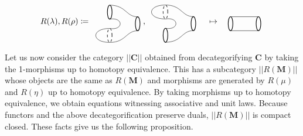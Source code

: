 \documentclass[11pt]{amsart}
\newcommand{\cat}[1]{\mathbf{#1}}
\theoremstyle{remark}
\theoremstyle{definition}
\begin{document}
%
%
%
\[
%
%
R(\lambda) , R(\rho) \coloneqq
\raisebox{-0.5\height}{%
\begin{tikzpicture}
\begin{scope}[shift={(1.2,-0.5)}]
\draw [thick]  (1.6,-0.2) ellipse (0.1 and 0.3);
\draw [thick]  (0.4,0.3) ellipse (0.1 and 0.3);
\draw [dashed] (0.4,-0.7) ellipse (0.1 and 0.3);
\draw (0.4,0) .. controls (1,0.1) and (1,-0.5) .. (0.4,-0.4);
\draw (0.4,0.6) .. controls (1.1,0.6) and (1.1,0.1) .. (1.6,0.1);
\draw (0.4,-1) .. controls (1.1,-1) and (1.1,-0.5) .. (1.6,-0.5);
\end{scope}
\begin{scope}[shift={(1.6,-1.2)}]
\draw [dashed]  (0,0) ellipse (0.1 and 0.3);
\draw (0,0.3) .. controls (-0.8,0.3) and (-0.8,-0.3) .. (0,-0.3);
\end{scope}
\end{tikzpicture}
}
%
%
%
,
%
%
\raisebox{-0.5\height}{%
\begin{tikzpicture}
\begin{scope}[shift={(1.2,-0.5)}]
\draw [thick]  (1.6,-0.2) ellipse (0.1 and 0.3);
\draw [dashed]  (0.4,0.3) ellipse (0.1 and 0.3);
\draw [thick] (0.4,-0.7) ellipse (0.1 and 0.3);
\draw (0.4,0) .. controls (1,0.1) and (1,-0.5) .. (0.4,-0.4);
\draw (0.4,0.6) .. controls (1.1,0.6) and (1.1,0.1) .. (1.6,0.1);
\draw (0.4,-1) .. controls (1.1,-1) and (1.1,-0.5) .. (1.6,-0.5);
\end{scope}
\begin{scope}[shift={(1.6,-0.2)}]
\draw [dashed]  (0,0) ellipse (0.1 and 0.3);
\draw (0,0.3) .. controls (-0.8,0.3) and (-0.8,-0.3) .. (0,-0.3);
\end{scope}
\end{tikzpicture}
}
%
%
%
\quad \mapsto \quad
%
%
\raisebox{-0.5\height}{%
\begin{tikzpicture}
\draw [thick]  (1.6,-0.2) ellipse (0.1 and 0.3);
\draw [thick] (0.4,-0.2) ellipse (0.1 and 0.3);
\draw (0.4,0.1) -- (1.6,0.1);
\draw (0.4,-0.5) -- (1.6,-0.5);
\end{tikzpicture}
}
\]

Let us now consider 
the category $|| \cat{ C } ||$ 
obtained from decategorifying 
$ \cat{ C } $ by taking the 
1-morphisms up to 
homotopy equivalence.  
This has a subcategory 
	$|| R ( \cat{ M } ) ||$ 
whose objects are the same 
as $ R ( \cat{ M } ) $ and 
morphisms are generated by 
$ R ( \mu ) $ and $ R ( \eta ) $ 
up to homotopy equivalence.
By taking morphisms up to
homotopy equivalence,
we obtain equations witnessing
associative and unit laws.
Because functors and
the above decategorification
preserve duals,
$|| R ( \cat{ M } ) ||$ 
is compact closed. 
These facts give us
the following proposition.
\end{document}
